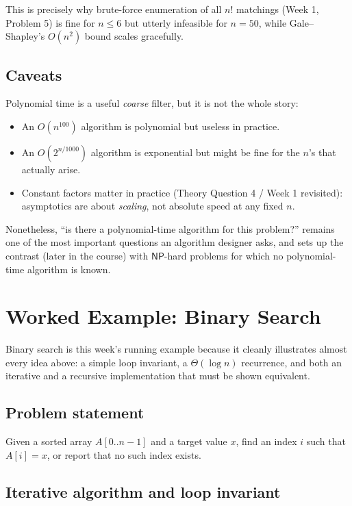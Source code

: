 \documentclass[11pt]{article}
\begin{document}
This is precisely why brute-force enumeration of all $n!$ matchings (Week 1, Problem 5) is
fine for $n \le 6$ but utterly infeasible for $n = 50$, while Gale--Shapley's $O(n^2)$
bound scales gracefully.

\subsection{Caveats}

Polynomial time is a useful \emph{coarse} filter, but it is not the whole story:

\begin{itemize}
    \item An $O(n^{100})$ algorithm is polynomial but useless in practice.
    \item An $O(2^{n/1000})$ algorithm is exponential but might be fine for the $n$'s that
    actually arise.
    \item Constant factors matter in practice (Theory Question 4 / Week 1 revisited):
    asymptotics are about \emph{scaling}, not absolute speed at any fixed $n$.
\end{itemize}

Nonetheless, ``is there a polynomial-time algorithm for this problem?'' remains one of the
most important questions an algorithm designer asks, and sets up the contrast (later in
the course) with $\mathsf{NP}$-hard problems for which no polynomial-time algorithm is
known.

\section{Worked Example: Binary Search}

Binary search is this week's running example because it cleanly illustrates almost every
idea above: a simple loop invariant, a $\Theta(\log n)$ recurrence, and both an iterative
and a recursive implementation that must be shown equivalent.

\subsection{Problem statement}

Given a sorted array $A[0..n-1]$ and a target value $x$, find an index $i$ such that
$A[i] = x$, or report that no such index exists.

\subsection{Iterative algorithm and loop invariant}
\end{document}

